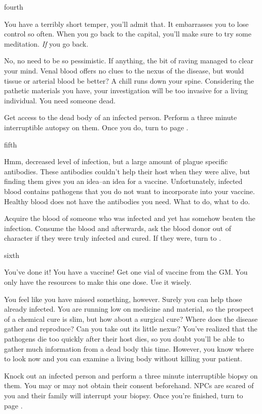 \documentclass[greennotebook]{guildcamp4} %
\begin{document}
\begin{page}{fourth}

You have a terribly short temper, you'll admit that. It embarrasses you to lose control so often. When you go back to the capital, you'll make sure to try some meditation. \textit{If} you go back.

No, no need to be so pessimistic. If anything, the bit of raving managed to clear your mind. Venal blood offers no clues to the nexus of the disease, but would tissue or arterial blood be better? A chill runs down your spine. Considering the pathetic materials you have, your investigation will be too invasive for a living individual. You need someone dead.

Get access to the dead body of an infected person. Perform a three minute interruptible autopsy on them. Once you do, turn to page .

\end{page}

\begin{page}{fifth}

Hmm, decreased level of infection, but a large amount of plague specific antibodies. These antibodies couldn't help their host when they were alive, but finding them gives you an idea--an idea for a vaccine. Unfortunately, infected blood contains pathogens that you do not want to incorporate into your vaccine. Healthy blood does not have the antibodies you need. What to do, what to do.

Acquire the blood of someone who was infected and yet has somehow beaten the infection. Consume the blood and afterwards, ask the blood donor out of character if they were truly infected and cured. If they were, turn to .

\end{page}

\begin{page}{sixth}

You've done it! You have a vaccine! Get one vial of vaccine from the GM. You only have the resources to make this one dose. Use it wisely.

You feel like you have missed something, however. Surely you can help those already infected. You are running low on medicine and material, so the prospect of a chemical cure is slim, but how about a surgical cure? Where does the disease gather and reproduce? Can you take out its little nexus? You've realized that the pathogens die too quickly after their host dies, so you doubt you'll be able to gather much information from a dead body this time. However, you know where to look now and you can examine a living body without killing your patient.

Knock out an infected person and perform a three minute interruptible biopsy on them. You may or may not obtain their consent beforehand. NPCs are scared of you and their family will interrupt your biopsy. Once you're finished, turn to page .

\end{page}
\end{document}

